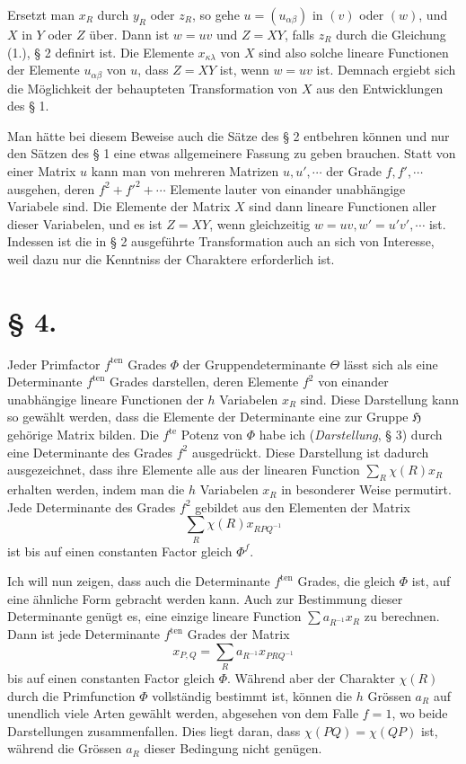 \documentclass[11pt]{article}
\newcommand{\Hgr}{\mathfrak{H}}
\newcommand{\ten}{\mathrm{ten}}
\newcommand{\te}{\mathrm{te}}
\begin{document}
Ersetzt man $x_R$ durch $y_R$ oder $z_R$, so gehe $u=(u_{\alpha\beta})$ in $(v)$ oder $(w)$, und $X$ in $Y$ oder $Z$ über. Dann ist $w=uv$ und $Z=XY$, falls $z_R$ durch die Gleichung (1.), § 2 definirt ist. Die Elemente $x_{\kappa\lambda}$ von $X$ sind also solche lineare Functionen der Elemente $u_{\alpha\beta}$ von $u$, dass $Z=XY$ ist, wenn $w=uv$ ist. Demnach ergiebt sich die Möglichkeit der behaupteten Transformation von $X$ aus den Entwicklungen des § 1.

Man hätte bei diesem Beweise auch die Sätze des § 2 entbehren können und nur den Sätzen des § 1 eine etwas allgemeinere Fassung zu geben brauchen. Statt von einer Matrix $u$ kann man von mehreren Matrizen $u,u',\cdots$ der Grade $f,f',\cdots$ ausgehen, deren $f^2+f'^2+\cdots$ Elemente lauter von einander unabhängige Variabele sind. Die Elemente der Matrix $X$ sind dann lineare Functionen aller dieser Variabelen, und es ist $Z=XY$, wenn gleichzeitig $w=uv,w'=u'v',\cdots$ ist. Indessen ist die in § 2 ausgeführte Transformation auch an sich von Interesse, weil dazu nur die Kenntniss der Charaktere erforderlich ist.

\section*{§ 4.}

Jeder Primfactor $f^{\ten}$ Grades $\Phi$ der Gruppendeterminante $\Theta$ lässt sich als eine Determinante $f^{\ten}$ Grades darstellen, deren Elemente $f^2$ von einander unabhängige lineare Functionen der $h$ Variabelen $x_R$ sind. Diese Darstellung kann so gewählt werden, dass die Elemente der Determinante eine zur Gruppe $\Hgr$ gehörige Matrix bilden. Die $f^{\te}$ Potenz von $\Phi$ habe ich (\emph{Darstellung}, § 3) durch eine Determinante des Grades $f^2$ ausgedrückt. Diese Darstellung ist dadurch ausgezeichnet, dass ihre Elemente alle aus der linearen Function $\sum_R\chi(R)x_R$ erhalten werden, indem man die $h$ Variabelen $x_R$ in besonderer Weise permutirt. Jede Determinante des Grades $f^2$ gebildet aus den Elementen der Matrix
\begin{equation}\tag{1.}
\sum_R\chi(R)x_{RPQ^{-1}}
\end{equation}
ist bis auf einen constanten Factor gleich $\Phi^f$.

Ich will nun zeigen, dass auch die Determinante $f^{\ten}$ Grades, die gleich $\Phi$ ist, auf eine ähnliche Form gebracht werden kann. Auch zur Bestimmung dieser Determinante genügt es, eine einzige lineare Function $\sum a_{R^{-1}}x_R$ zu berechnen. Dann ist jede Determinante $f^{\ten}$ Grades der Matrix
\begin{equation}\tag{2.}
x_{P,Q}=\sum_R a_{R^{-1}}x_{PRQ^{-1}}
\end{equation}
bis auf einen constanten Factor gleich $\Phi$. Während aber der Charakter $\chi(R)$ durch die Primfunction $\Phi$ vollständig bestimmt ist, können die $h$ Grössen $a_R$ auf unendlich viele Arten gewählt werden, abgesehen von dem Falle $f=1$, wo beide Darstellungen zusammenfallen. Dies liegt daran, dass $\chi(PQ)=\chi(QP)$ ist, während die Grössen $a_R$ dieser Bedingung nicht genügen.
\end{document}
